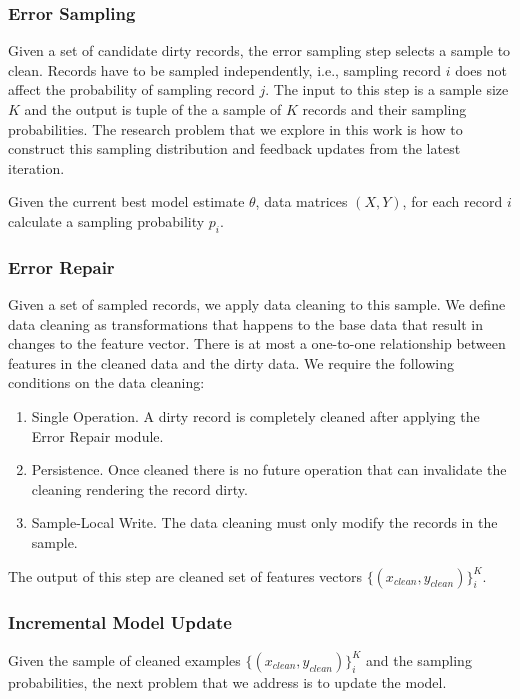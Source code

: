 \iffalse


\subsubsection{Error Sampling}
Given a set of candidate dirty records, the error sampling step selects a sample to clean.
Records have to be sampled independently, i.e., sampling record $i$ does not affect the probability of sampling record $j$.
The input to this step is a sample size $K$ and the output is tuple of the a sample of $K$ records and their sampling probabilities.
The research problem that we explore in this work is how to construct this sampling distribution and feedback updates from the latest iteration.

\begin{problem}\label{imp-samp}\sloppy
Given the current best model estimate $\theta$, data matrices $(X,Y)$, for each record $i$ calculate a sampling probability $p_i$.
\end{problem}

\subsubsection{Error Repair}
Given a set of sampled records, we apply data cleaning to this sample.
We define data cleaning as transformations that happens to the base data that result in changes to the feature vector. 
There is at most a one-to-one relationship between features in the cleaned data and the dirty data.
We require the following conditions on the data cleaning:
\begin{enumerate}
\item Single Operation. A dirty record is completely cleaned after applying the Error Repair module.
\item Persistence. Once cleaned there is no future operation that can invalidate the cleaning rendering the record dirty.
\item Sample-Local Write. The data cleaning must only modify the records in the sample.
\end{enumerate}
The output of this step are cleaned set of features vectors $\{(x_{clean},y_{clean})\}^K_i$.

\subsubsection{Incremental Model Update}
Given the sample of cleaned examples $\{(x_{clean},y_{clean})\}^K_i$ and the sampling probabilities, the next problem that we address is to update the model.

